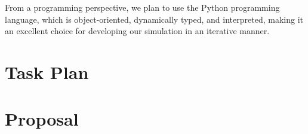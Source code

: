 \documentclass[12pt]{article}
\begin{document}
From a programming perspective, we plan to use the Python programming language,
which is object-oriented, dynamically typed, and interpreted, making it an
excellent choice for developing our simulation in an iterative manner.

\section{Task Plan}
\label{sec:taskplan}

\section{Proposal}
\label{sec:proposal}

\clearpage
{}

\end{document}
